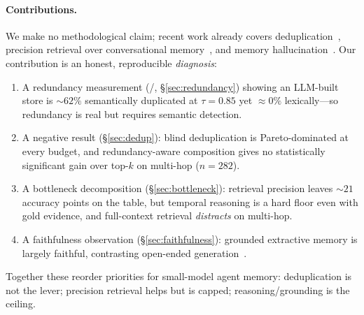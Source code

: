 \paragraph{Contributions.} We make no methodological claim; recent work already
covers deduplication~\cite{abbas2023semdedup,peng2025adagres}, precision
retrieval over conversational memory~\cite{li2026evimem,ji2026mragent}, and
memory hallucination~\cite{chen2025halumem}. Our contribution is an honest,
reproducible \emph{diagnosis}:
\begin{enumerate}
  \item A redundancy measurement (\mdr/\rtf, \S\ref{sec:redundancy}) showing an
  LLM-built store is $\sim\!62\%$ semantically duplicated at $\tau{=}0.85$ yet
  $\approx\!0\%$ lexically---so redundancy is real but requires semantic
  detection.
  \item A negative result (\S\ref{sec:dedup}): blind deduplication is
  Pareto-dominated at every budget, and redundancy-aware composition gives no
  statistically significant gain over top-$k$ on multi-hop ($n{=}282$).
  \item A bottleneck decomposition (\S\ref{sec:bottleneck}): retrieval precision
  leaves $\sim\!21$ accuracy points on the table, but temporal reasoning is a
  hard floor even with gold evidence, and full-context retrieval \emph{distracts}
  on multi-hop.
  \item A faithfulness observation (\S\ref{sec:faithfulness}): grounded
  extractive memory is largely faithful, contrasting open-ended
  generation~\cite{min2023factscore}.
\end{enumerate}
Together these reorder priorities for small-model agent memory: deduplication is
not the lever; precision retrieval helps but is capped; reasoning/grounding is
the ceiling.
